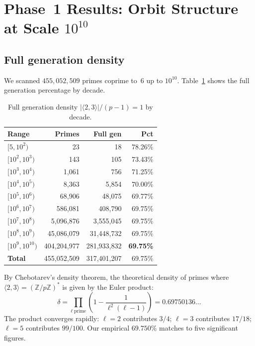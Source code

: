 \documentclass[11pt,a4paper]{article}
\begin{document}
\section{Phase~1 Results: Orbit Structure at Scale $10^{10}$}

\subsection{Full generation density}

We scanned $455{,}052{,}509$ primes coprime to~6 up to $10^{10}$.
Table~\ref{tab:fullgen} shows the full generation percentage by decade.

\begin{table}[h]
\centering
\caption{Full generation density $|\langle 2,3 \rangle| / (p-1) = 1$ by decade.}
\label{tab:fullgen}
\begin{tabular}{lrrr}
\toprule
Range & Primes & Full gen & Pct \\
\midrule
$[5, 10^2)$          &            23 &            18 & 78.26\% \\
$[10^2, 10^3)$       &           143 &           105 & 73.43\% \\
$[10^3, 10^4)$       &         1,061 &           756 & 71.25\% \\
$[10^4, 10^5)$       &         8,363 &         5,854 & 70.00\% \\
$[10^5, 10^6)$       &        68,906 &        48,075 & 69.77\% \\
$[10^6, 10^7)$       &       586,081 &       408,790 & 69.75\% \\
$[10^7, 10^8)$       &     5,096,876 &     3,555,045 & 69.75\% \\
$[10^8, 10^9)$       &    45,086,079 &    31,448,732 & 69.75\% \\
$[10^9, 10^{10})$    &   404,204,977 &   281,933,832 & \textbf{69.75\%} \\
\midrule
\textbf{Total}       &   455,052,509 &   317,401,207 & 69.75\% \\
\bottomrule
\end{tabular}
\end{table}

By Chebotarev's density theorem, the theoretical density of primes where
$\langle 2, 3 \rangle = (\mathbb{Z}/p\mathbb{Z})^*$ is given by the
Euler product:
\begin{equation}
\label{eq:euler}
\delta = \prod_{\ell\ \text{prime}} \left(1 - \frac{1}{\ell^2(\ell - 1)}\right)
= 0.69750136\ldots
\end{equation}
The product converges rapidly: $\ell = 2$ contributes $3/4$;
$\ell = 3$ contributes $17/18$; $\ell = 5$ contributes $99/100$.
Our empirical $69.750\%$ matches to five significant figures.
\end{document}
